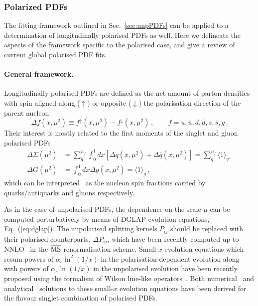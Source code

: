 \subsubsection{Polarized PDFs}
\label{sec:polPDFs}

The fitting framework outlined in Sec.~\ref{sec:unpPDFs} can be applied
to a determination of longitudinally polarised PDFs as well.
%
Here we delineate the aspects of the framework specific to the polarised
case, and give a review of current global polarised PDF fits.

\paragraph{General framework.}
%
Longitudinally-polarised PDFs are defined as the net amount of parton 
densities with spin aligned along ($\uparrow$) or opposite ($\downarrow$)
the polarisation direction of the parent nucleon
\begin{equation}
\Delta f(x,\mu^2) \equiv f^{\uparrow}(x,\mu^2) - f^{\downarrow}(x,\mu^2)
\,\mbox{,}
\ \ \ \ \ \ \ \ \ \
f=u,\bar{u},d,\bar{d},s,\bar{s},g
\,\mbox{.}
\label{eq:polPDFs}
\end{equation}
%
Their interest is mostly related to the
first moments of the singlet and gluon polarised PDFs
\begin{align}
\Delta\Sigma(\mu^2)
& =
\sum_{q}^{n_f}\int_0^1 dx 
\left[\Delta q(x, \mu^2) + \Delta\bar{q}(x, \mu^2)\right]
=
\sum_q^{n_f}\langle 1 \rangle_{q^+}
\\
\Delta G(\mu^2)
& =
\int_0^1 dx \Delta g(x,\mu^2)
=
\langle 1 \rangle_g
\,,
\label{eq:moments}
\end{align}
which can be interpreted~\cite{Leader:2013jra} as the nucleon spin fractions 
carried by quarks/antiquarks and gluons respectively.

As in the case of unpolarised PDFs, the dependence on the scale $\mu$ can 
be computed perturbatively by means of DGLAP evolution equations, 
Eq.~(\ref{eq:dglap}).
%
The unpolarised splitting kernels $P_{ij}$ should be replaced with their
polarised counterparts, $\Delta P_{ij}$, which have been recently computed 
up to NNLO~\cite{Moch:2014sna} in the $\overline{\rm MS}$ renormalisation 
scheme.
%
Small-$x$ evolution equations which resum powers of $\alpha_s\ln^2(1/x)$
in the polarisation-dependent evolution along with powers of $\alpha_s\ln(1/x)$
in the unpolarised evolution have been recently proposed using the formalism
of Wilson line-like operators~\cite{Kovchegov:2015pbl}.
%
Both numerical~\cite{Kovchegov:2016weo}
and analytical~\cite{Kovchegov:2016zex,Kovchegov:2017jxc}
solutions to these small-$x$ evolution equations have been derived
for the flavour singlet combination of polarised PDFs.

